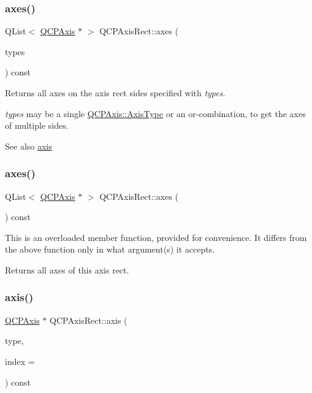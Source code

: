 \subsubsection{\texorpdfstring{axes()}{axes()}\hspace{0.1cm}{\footnotesize\ttfamily [1/2]}}
{\footnotesize\ttfamily Q\+List$<$ \mbox{\hyperlink{class_q_c_p_axis}{Q\+C\+P\+Axis}} $\ast$ $>$ Q\+C\+P\+Axis\+Rect\+::axes (\begin{DoxyParamCaption}\item[{Q\+C\+P\+Axis\+::\+Axis\+Types}]{types }\end{DoxyParamCaption}) const}

Returns all axes on the axis rect sides specified with {\itshape types}.

{\itshape types} may be a single \mbox{\hyperlink{class_q_c_p_axis_ae2bcc1728b382f10f064612b368bc18a}{Q\+C\+P\+Axis\+::\+Axis\+Type}} or an {\ttfamily or}-\/combination, to get the axes of multiple sides.

\begin{DoxySeeAlso}{See also}
\mbox{\hyperlink{class_q_c_p_axis_rect_a583ae4f6d78b601b732183f6cabecbe1}{axis}} 
\end{DoxySeeAlso}
\mbox{\label{class_q_c_p_axis_rect_a11657b8faebe9677180860e8057ede26}} 
\subsubsection{\texorpdfstring{axes()}{axes()}\hspace{0.1cm}{\footnotesize\ttfamily [2/2]}}
{\footnotesize\ttfamily Q\+List$<$ \mbox{\hyperlink{class_q_c_p_axis}{Q\+C\+P\+Axis}} $\ast$ $>$ Q\+C\+P\+Axis\+Rect\+::axes (\begin{DoxyParamCaption}{ }\end{DoxyParamCaption}) const}

This is an overloaded member function, provided for convenience. It differs from the above function only in what argument(s) it accepts.

Returns all axes of this axis rect. \mbox{\label{class_q_c_p_axis_rect_a583ae4f6d78b601b732183f6cabecbe1}} 
\subsubsection{\texorpdfstring{axis()}{axis()}}
{\footnotesize\ttfamily \mbox{\hyperlink{class_q_c_p_axis}{Q\+C\+P\+Axis}} $\ast$ Q\+C\+P\+Axis\+Rect\+::axis (\begin{DoxyParamCaption}\item[{\mbox{\hyperlink{class_q_c_p_axis_ae2bcc1728b382f10f064612b368bc18a}{Q\+C\+P\+Axis\+::\+Axis\+Type}}}]{type,  }\item[{int}]{index = {} }\end{DoxyParamCaption}) const}

